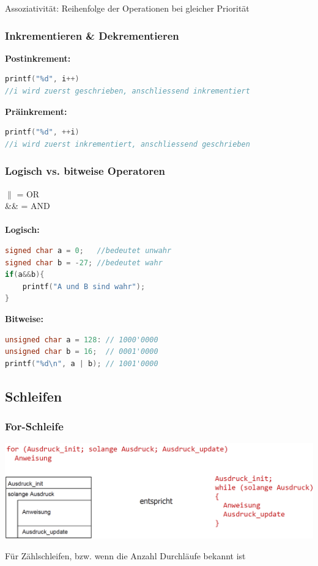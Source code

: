 			Assoziativität: Reihenfolge der Operationen bei gleicher Priorität
		
		\subsubsection{Inkrementieren \& Dekrementieren}
			\textbf{Postinkrement:}
			\begin{lstlisting}[language=C]
printf("%d", i++)
//i wird zuerst geschrieben, anschliessend inkrementiert
			\end{lstlisting}
			\textbf{Präinkrement:}
			\begin{lstlisting}[language=C]
printf("%d", ++i)
//i wird zuerst inkrementiert, anschliessend geschrieben
			\end{lstlisting}

		\subsubsection{Logisch vs. bitweise Operatoren}
			$\parallel$ = OR\\
			\&\& = AND \\
			\\
			\textbf{Logisch:}
				\begin{lstlisting}[language=C]
signed char a = 0;   //bedeutet unwahr
signed char b = -27; //bedeutet wahr
if(a&&b){
	printf("A und B sind wahr");
}	
				\end{lstlisting}
			\textbf{Bitweise:}
				\begin{lstlisting}[language=C]
unsigned char a = 128: // 1000'0000
unsigned char b = 16;  // 0001'0000
printf("%d\n", a | b); // 1001'0000 
				\end{lstlisting}

	\subsection{Schleifen}
		\subsubsection{For-Schleife}
			\begin{minipage}{.7\linewidth}
				\includegraphics[width=0.95\linewidth]{Bilder/forschleife.png}
			\end{minipage}
			\hfill
			\begin{minipage}{0.3\linewidth}
				Für Zählschleifen, bzw. wenn die Anzahl Durchläufe bekannt ist
			\end{minipage}

